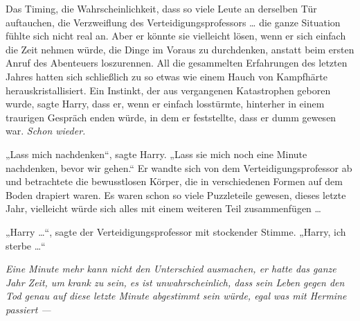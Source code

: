 Das Timing, die Wahrscheinlichkeit, dass so viele Leute an derselben Tür auftauchen, die Verzweiflung des Verteidigungsprofessors … die ganze Situation fühlte sich nicht real an. Aber er könnte sie vielleicht lösen, wenn er sich einfach die Zeit nehmen würde, die Dinge im Voraus zu durchdenken, anstatt beim ersten Anruf des Abenteuers loszurennen. All die gesammelten Erfahrungen des letzten Jahres hatten sich schließlich zu so etwas wie einem Hauch von Kampfhärte herauskristallisiert. Ein Instinkt, der aus vergangenen Katastrophen geboren wurde, sagte Harry, dass er, wenn er einfach losstürmte, hinterher in einem traurigen Gespräch enden würde, in dem er feststellte, dass er dumm gewesen war. \emph{Schon wieder.}

„Lass mich nachdenken“, sagte Harry.
„Lass sie mich noch eine Minute nachdenken, bevor wir gehen.“
Er wandte sich von dem Verteidigungsprofessor ab und betrachtete die bewusstlosen Körper, die in verschiedenen Formen auf dem Boden drapiert waren. Es waren schon so viele Puzzleteile gewesen, dieses letzte Jahr, vielleicht würde sich alles mit einem weiteren Teil zusammenfügen …

„Harry …“, sagte der Verteidigungsprofessor mit stockender Stimme.
„Harry, ich sterbe …“

\emph{Eine Minute mehr kann nicht den Unterschied ausmachen, er hatte das \emph{ganze Jahr} Zeit, um krank zu sein, es ist \emph{unwahrscheinlich}, dass sein Leben gegen den Tod genau auf diese letzte Minute abgestimmt sein würde, egal was mit Hermine passiert —}


